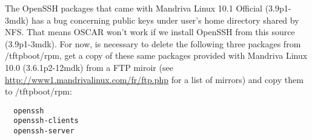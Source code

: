 \begin{itemize}
The OpenSSH packages that came with Mandriva Linux 10.1 Official (3.9p1-3mdk)
has a bug concerning public keys under user's home directory shared by NFS. 
That means OSCAR won't work if we install OpenSSH from this source 
(3.9p1-3mdk).  For now, is necessary to delete the following three packages 
from /tftpboot/rpm, get a copy of these same packages provided with Mandriva
Linux 10.0 (3.6.1p2-12mdk) from a FTP miroir (see 
\url{http://www1.mandrivalinux.com/fr/ftp.php} for a list of mirrors) and copy 
them to /tftpboot/rpm:
\begin{verbatim}
  openssh
  openssh-clients
  openssh-server
\end{verbatim}

\end{itemize}

